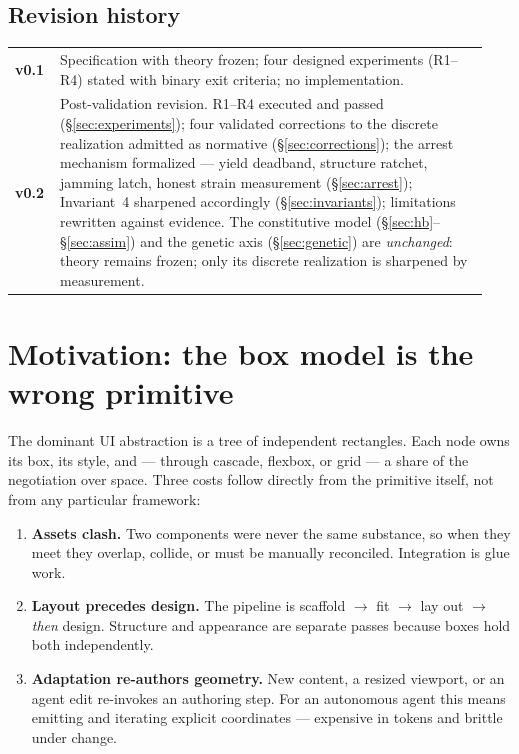 \documentclass[11pt]{article}
\begin{document}
\subsection*{Revision history}
\begin{center}
\begin{tabular}{@{}p{0.08\linewidth}p{0.86\linewidth}@{}}
\toprule
\textbf{v0.1} & Specification with theory frozen; four designed experiments (R1--R4) stated
with binary exit criteria; no implementation. \\
\textbf{v0.2} & Post-validation revision. R1--R4 executed and passed (\S\ref{sec:experiments});
four validated corrections to the discrete realization admitted as normative
(\S\ref{sec:corrections}); the arrest mechanism formalized --- yield deadband, structure
ratchet, jamming latch, honest strain measurement (\S\ref{sec:arrest}); Invariant~4 sharpened
accordingly (\S\ref{sec:invariants}); limitations rewritten against evidence. The constitutive
model (\S\ref{sec:hb}--\S\ref{sec:assim}) and the genetic axis (\S\ref{sec:genetic}) are
\emph{unchanged}: theory remains frozen; only its discrete realization is sharpened by
measurement. \\
\bottomrule
\end{tabular}
\end{center}

\section{Motivation: the box model is the wrong primitive}

The dominant UI abstraction is a tree of independent rectangles. Each node owns its box, its
style, and --- through cascade, flexbox, or grid --- a share of the negotiation over space.
Three costs follow directly from the primitive itself, not from any particular framework:

\begin{enumerate}[leftmargin=1.4em]
  \item \textbf{Assets clash.} Two components were never the same substance, so when they meet
  they overlap, collide, or must be manually reconciled. Integration is glue work.
  \item \textbf{Layout precedes design.} The pipeline is scaffold $\rightarrow$ fit $\rightarrow$
  lay out $\rightarrow$ \emph{then} design. Structure and appearance are separate passes because
  boxes hold both independently.
  \item \textbf{Adaptation re-authors geometry.} New content, a resized viewport, or an
  agent edit re-invokes an authoring step. For an autonomous agent this means emitting and
  iterating explicit coordinates --- expensive in tokens and brittle under change.
\end{enumerate}
\end{document}

